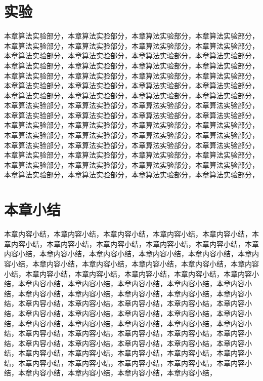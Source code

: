 \documentclass[unicode,pdfcover]{hquthesis}
\begin{document}
\section{实验}

本章算法实验部分，本章算法实验部分，本章算法实验部分，本章算法实验部分，本章算法实验部分，本章算法实验部分，本章算法实验部分，本章算法实验部分，本章算法实验部分，本章算法实验部分，本章算法实验部分，本章算法实验部分，本章算法实验部分，本章算法实验部分，本章算法实验部分，本章算法实验部分，本章算法实验部分，本章算法实验部分，本章算法实验部分，本章算法实验部分，本章算法实验部分，本章算法实验部分，本章算法实验部分，本章算法实验部分，本章算法实验部分，本章算法实验部分，本章算法实验部分，本章算法实验部分，本章算法实验部分，本章算法实验部分，本章算法实验部分，本章算法实验部分，本章算法实验部分，本章算法实验部分，本章算法实验部分，本章算法实验部分，本章算法实验部分，本章算法实验部分，本章算法实验部分，本章算法实验部分，本章算法实验部分，本章算法实验部分，本章算法实验部分，本章算法实验部分，本章算法实验部分，本章算法实验部分，本章算法实验部分，本章算法实验部分，本章算法实验部分，本章算法实验部分，本章算法实验部分，本章算法实验部分，本章算法实验部分，本章算法实验部分，本章算法实验部分，本章算法实验部分，本章算法实验部分，本章算法实验部分，本章算法实验部分，本章算法实验部分，

\section{本章小结}

本章内容小结，本章内容小结，本章内容小结，本章内容小结，本章内容小结，本章内容小结，本章内容小结，本章内容小结，本章内容小结，本章内容小结，本章内容小结，本章内容小结，本章内容小结，本章内容小结，本章内容小结，本章内容小结，本章内容小结，本章内容小结，本章内容小结，本章内容小结，本章内容小结，本章内容小结，本章内容小结，本章内容小结，本章内容小结，本章内容小结，本章内容小结，本章内容小结，本章内容小结，本章内容小结，本章内容小结，本章内容小结，本章内容小结，本章内容小结，本章内容小结，本章内容小结，本章内容小结，本章内容小结，本章内容小结，本章内容小结，本章内容小结，本章内容小结，本章内容小结，本章内容小结，本章内容小结，本章内容小结，本章内容小结，本章内容小结，本章内容小结，本章内容小结，本章内容小结，本章内容小结，本章内容小结，本章内容小结，本章内容小结，本章内容小结，本章内容小结，本章内容小结，本章内容小结，本章内容小结，本章内容小结，本章内容小结，本章内容小结，本章内容小结，本章内容小结，本章内容小结，本章内容小结，本章内容小结，本章内容小结，本章内容小结，本章内容小结，本章内容小结，本章内容小结，本章内容小结，本章内容小结，
\end{document}
